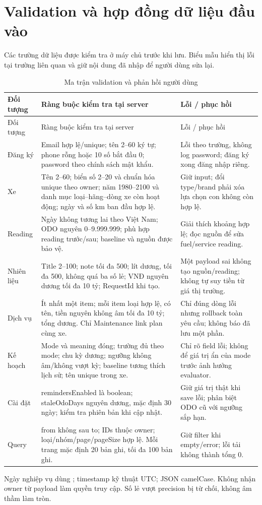 \section{Validation và hợp đồng dữ liệu đầu vào}
Các trường dữ liệu được kiểm tra ở máy chủ trước khi lưu. Biểu mẫu hiển thị lỗi tại trường liên quan và giữ nội dung đã nhập để người dùng sửa lại.
\begin{smalltable}\begin{longtable}{L{2.1cm}L{8.6cm}L{3.8cm}}
\caption{Ma trận validation và phản hồi người dùng}\label{tab:validation}\\\toprule Đối tượng & Ràng buộc kiểm tra tại server & Lỗi / phục hồi\\\midrule\endfirsthead
\toprule Đối tượng & Ràng buộc kiểm tra tại server & Lỗi / phục hồi\\\midrule\endhead
Đăng ký & Email hợp lệ/unique; tên 2--60 ký tự; phone rỗng hoặc 10 số bắt đầu 0; password theo chính sách mật khẩu. & Lỗi theo trường, không log password; đăng ký xong đăng nhập riêng.\\
Xe & Tên 2--60; biển số 2--20 và chuẩn hóa unique theo owner; năm 1980--2100 và danh mục loại--hãng--dòng xe còn hoạt động; ngày và số km ban đầu hợp lệ. & Giữ input; đổi type/brand phải xóa lựa chọn con không còn hợp lệ.\\
Reading & Ngày không tương lai theo Việt Nam; ODO nguyên 0--9.999.999; phù hợp reading trước/sau; baseline và nguồn được bảo vệ. & Giải thích khoảng hợp lệ; đọc nguồn để sửa fuel/service reading.\\
Nhiên liệu & Title 2--100; note tối đa 500; lít dương, tối đa 500, không quá ba số lẻ; VNĐ nguyên dương tối đa 10 tỷ; RequestId khi tạo. & Một payload sai không tạo nguồn/reading; không tự suy tiền từ giá thị trường.\\
Dịch vụ & Ít nhất một item; mỗi item loại hợp lệ, có tên, tiền nguyên không âm tối đa 10 tỷ; tổng dương. Chỉ Maintenance link plan cùng xe. & Chỉ đúng dòng lỗi nhưng rollback toàn yêu cầu; không báo đã lưu một phần.\\
Kế hoạch & Mode và meaning đóng; trường đủ theo mode; chu kỳ dương; ngưỡng không âm/không vượt kỳ; baseline tương thích lịch sử; tên unique trong xe. & Chỉ rõ field lỗi; không để giá trị ẩn của mode trước ảnh hưởng evaluator.\\
Cài đặt & remindersEnabled là boolean; staleOdoDays nguyên dương, mặc định 30 ngày; kiểm tra phiên bản khi cập nhật. & Giữ giá trị thật khi save lỗi; phân biệt ODO cũ với ngưỡng sắp hạn.\\
Query & from không sau to; IDs thuộc owner; loại/nhóm/page/pageSize hợp lệ. Mỗi trang mặc định 20 bản ghi, tối đa 100 bản ghi. & Giữ filter khi empty/error; lỗi tải không thành tổng 0.\\\bottomrule
\end{longtable}\end{smalltable}
Ngày nghiệp vụ dùng ; timestamp kỹ thuật UTC; JSON camelCase. Không nhận owner từ payload làm quyền truy cập. Số lẻ vượt precision bị từ chối, không âm thầm làm tròn.

